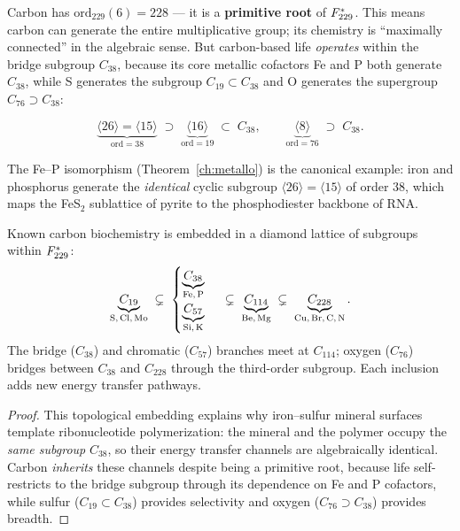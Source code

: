 Carbon has $\mathrm{ord}_{229}(6) = 228$ --- it is a \textbf{primitive root} of $F_{229}^*$.  This means carbon can generate the entire multiplicative group; its chemistry is ``maximally connected'' in the algebraic sense.  But carbon-based life \emph{operates} within the bridge subgroup $C_{38}$, because its core metallic cofactors Fe and P both generate $C_{38}$, while S generates the subgroup $C_{19} \subset C_{38}$ and O generates the supergroup $C_{76} \supset C_{38}$:

\begin{equation}
\label{eq:life-subgroup}
\underbrace{\langle 26 \rangle = \langle 15 \rangle}_{\mathrm{ord}=38} \;\supset\; \underbrace{\langle 16 \rangle}_{\mathrm{ord}=19} \;\subset\; C_{38}, \qquad \underbrace{\langle 8 \rangle}_{\mathrm{ord}=76} \;\supset\; C_{38}.
\end{equation}

The Fe--P isomorphism (Theorem~\ref{ch:metallo}) is the canonical example: iron and phosphorus generate the \emph{identical} cyclic subgroup $\langle 26 \rangle = \langle 15 \rangle$ of order 38, which maps the FeS$_2$ sublattice of pyrite to the phosphodiester backbone of RNA.

\begin{theorem}
Known carbon biochemistry is embedded in a diamond lattice of subgroups within $F_{229}^*$:
\[
\underbrace{C_{19}}_{\text{S,\,Cl,\,Mo}} \;\subsetneq\;
\begin{cases}
\underbrace{C_{38}}_{\text{Fe,\,P}} \\[4pt]
\underbrace{C_{57}}_{\text{Si,\,K}}
\end{cases}
\;\subsetneq\; \underbrace{C_{114}}_{\text{Be,\,Mg}} \;\subsetneq\; \underbrace{C_{228}}_{\text{Cu,\,Br,\,C,\,N}}.
\]
The bridge ($C_{38}$) and chromatic ($C_{57}$) branches meet at $C_{114}$; oxygen ($C_{76}$) bridges between $C_{38}$ and $C_{228}$ through the third-order subgroup.  Each inclusion adds new energy transfer pathways.
\end{theorem}

\begin{proof}
This topological embedding explains why iron--sulfur mineral surfaces template ribonucleotide polymerization: the mineral and the polymer occupy the \emph{same subgroup} $C_{38}$, so their energy transfer channels are algebraically identical.  Carbon \emph{inherits} these channels despite being a primitive root, because life self-restricts to the bridge subgroup through its dependence on Fe and P cofactors, while sulfur ($C_{19} \subset C_{38}$) provides selectivity and oxygen ($C_{76} \supset C_{38}$) provides breadth.
\qedhere
\end{proof}


